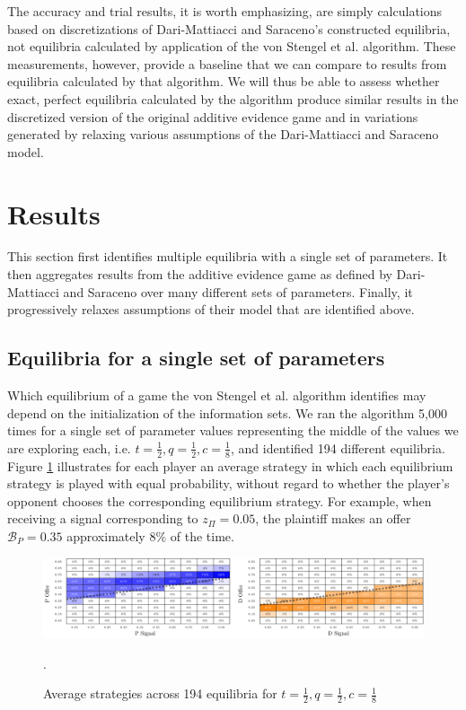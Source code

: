 \documentclass{article}
\begin{document}
The accuracy and trial results, it is worth emphasizing, are simply calculations based on discretizations of Dari-Mattiacci and Saraceno's constructed equilibria, not equilibria calculated by application of the von Stengel et al. algorithm. These measurements, however, provide a baseline that we can compare to results from equilibria calculated by that algorithm. We will thus be able to assess whether exact, perfect equilibria calculated by the algorithm produce similar results in the discretized version of the original additive evidence game and in variations generated by relaxing various assumptions of the Dari-Mattiacci and Saraceno model. 

\section{Results} \label{section:Results}

This section first identifies multiple equilibria with a single set of parameters. It then aggregates results from the additive evidence game as defined by Dari-Mattiacci and Saraceno over many different sets of parameters. Finally, it progressively relaxes assumptions of their model that are identified above.

\subsection{Equilibria for a single set of parameters}

Which equilibrium of a game the von Stengel et al. algorithm identifies may depend on the initialization of the information sets. We ran the algorithm 5,000 times for a single set of parameter values representing the middle of the values we are exploring each, i.e. $t=\frac{1}{2}, q=\frac{1}{2}, c=\frac{1}{8}$, and identified 194 different equilibria. Figure \ref{fig:multeq} illustrates for each player an average strategy in which each equilibrium strategy is played with equal probability, without regard to whether the player's opponent chooses the corresponding equilibrium strategy. For example, when receiving a signal corresponding to $z_\Pi = 0.05$, the plaintiff makes an offer $\mathcal{B}_P = 0.35$ approximately 8\% of the time. 

\begin{figure}[h!]
\centering
\includegraphics[scale=0.50, trim={0in 0in 0in 0in}, clip]{../Figures/average strategies.pdf}
\caption{Average strategies across 194 equilibria for $t = \frac{1}{2}, q = \frac{1}{2}, c = \frac{1}{8}$}. 
\label{fig:multeq}
\end{figure}
\end{document}
